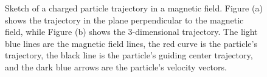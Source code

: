 \documentclass[my_thesis.tex]{subfiles}
\begin{document}
\begin{figure}
    \centering
    \caption{Sketch of a charged particle trajectory in a magnetic field. Figure (a) shows the trajectory in the plane perpendicular to the magnetic field, while Figure (b) shows the 3-dimensional trajectory. The light blue lines are the magnetic field lines, the red curve is the particle's trajectory, the black line is the particle's guiding center trajectory, and the dark blue arrows are the particle's velocity vectors.}
    \label{fig.gyromotion}
\end{figure}
\end{document}
